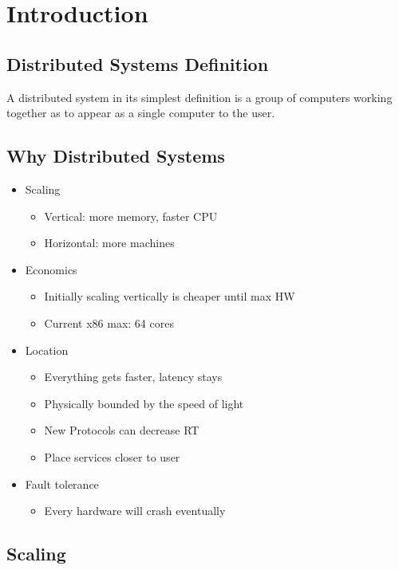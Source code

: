 
\section{Introduction}
\subsection{Distributed Systems Definition}
A distributed system in its simplest definition is a group of computers working together as to appear as a single computer to the user.
\subsection{Why Distributed Systems}
\begin{itemize}
    \item Scaling
    \begin{itemize}
        \item Vertical: more memory, faster CPU
        \item Horizontal: more machines
    \end{itemize}
    \item Economics
    \begin{itemize}
        \item Initially scaling vertically is cheaper until max HW
        \item Current x86 max: 64 cores
    \end{itemize}
    \item Location
    \begin{itemize}
        \item Everything gets faster, latency stays
        \item Physically bounded by the speed of light
        \item New Protocols can decrease RT
        \item Place services closer to user
    \end{itemize}
    \item Fault tolerance
    \begin{itemize}
        \item Every hardware will crash eventually
    \end{itemize}
\end{itemize}
\subsection{Scaling}
